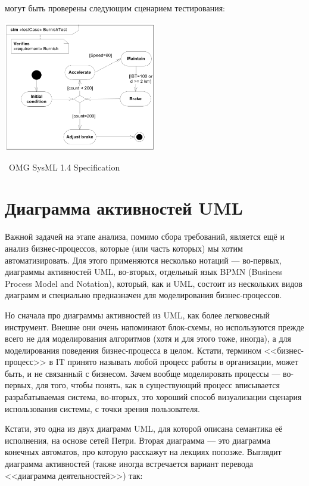 \documentclass[a5paper]{article}
\newcommand{\attribution}[1] {
    \vspace{-4mm}\begin{flushright}\begin{scriptsize}%
    {\textcopyright\, #1}\end{scriptsize}\end{flushright}
}
\begin{document}
могут быть проверены следующим сценарием тестирования:

\begin{center}
    \includegraphics[width=0.5\textwidth]{sysMlRequirementsTestActivity.png}
    \attribution{OMG SysML 1.4 Specification}
\end{center}

\section{Диаграмма активностей UML}

Важной задачей на этапе анализа, помимо сбора требований, является ещё и анализ бизнес-процессов, которые (или часть которых) мы хотим автоматизировать. Для этого применяются несколько нотаций --- во-первых, диаграммы активностей UML, во-вторых, отдельный язык BPMN (Business Process Model and Notation), который, как и UML, состоит из нескольких видов диаграмм и специально предназначен для моделирования бизнес-процессов.

Но сначала про диаграммы активностей из UML, как более легковесный инструмент. Внешне они очень напоминают блок-схемы, но используются прежде всего не для моделирования алгоритмов (хотя и для этого тоже, иногда), а для моделирования поведения бизнес-процесса в целом. Кстати, термином <<бизнес-процесс>> в IT принято называть любой процесс работы в организации, может быть, и не связанный с бизнесом. Зачем вообще моделировать процессы --- во-первых, для того, чтобы понять, как в существующий процесс вписывается разрабатываемая система, во-вторых, это хороший способ визуализации сценария использования системы, с точки зрения пользователя.

Кстати, это одна из двух диаграмм UML, для которой описана семантика её исполнения, на основе сетей Петри. Вторая диаграмма --- это диаграмма конечных автоматов, про которую расскажут на лекциях попозже. Выглядит диаграмма активностей (также иногда встречается вариант перевода <<диаграмма деятельностей>>) так:
\end{document}
